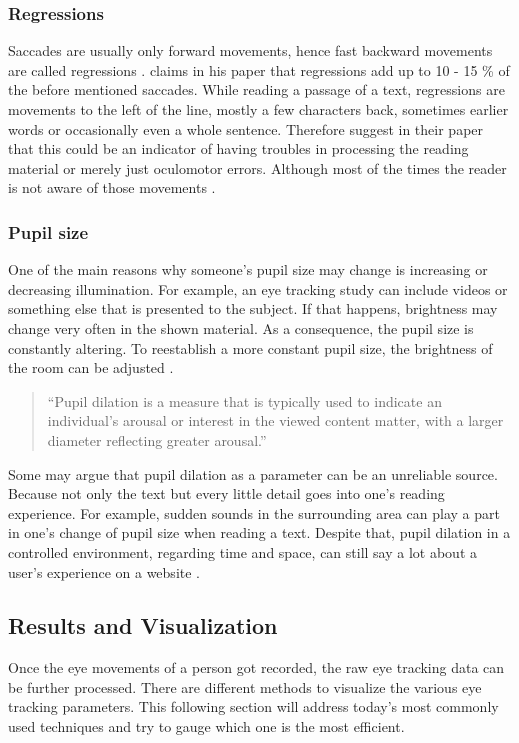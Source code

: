 \subsubsection{Regressions}
Saccades are usually only forward movements, hence fast backward movements are called regressions \autocite[]{reichle1998toward}. 
\textcite[]{rayner1998eye} claims in his paper that regressions add up to 10 - 15 \% of the before mentioned saccades.
While reading a passage of a text, regressions are movements to the left of the line, mostly a few characters back, sometimes earlier words or occasionally even a whole sentence. Therefore \textcite[]{kruger2014subtitles} suggest in their paper that this could be an indicator of having troubles in processing the reading material or merely just oculomotor errors. Although most of the times the reader is not aware of those movements \autocite[]{reichle2003ez, biedert2010eyebook}.

\subsubsection{Pupil size}
One of the main reasons why someone's pupil size may change is increasing or decreasing illumination. For example, an eye tracking study can include videos or something else that is presented to the subject. If that happens, brightness may change very often in the shown material. As a consequence, the pupil size is constantly altering. To reestablish a more constant pupil size, the brightness of the room can be adjusted \autocite[]{goldberg2002eye}.

\begin{quote}
``Pupil dilation is a measure that is typically used to indicate an individual’s arousal or interest in the viewed content matter, with a larger diameter reflecting greater arousal.''
\autocite[3]{joachims2017accurately}
\end{quote}

Some may argue that pupil dilation as a parameter can be an unreliable source. 
Because not only the text but every little detail goes into one's reading experience. For example, sudden sounds in the surrounding area can play a part in one's change of pupil size when reading a text. 
Despite that, pupil dilation in a controlled environment, regarding time and space, can still say a lot about a user's experience on a website \autocite[]{bruneau2002eyes}.

\subsection{Results and Visualization}
\label{subsection:ResultsVisualization}
Once the eye movements of a person got recorded, the raw eye tracking data can be further processed. There are different methods to visualize the various eye tracking parameters. This following section will address today's most commonly used techniques and try to gauge which one is the most efficient.

